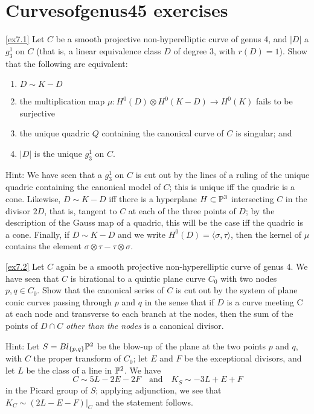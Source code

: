 


\chapter{Curvesofgenus45 exercises}\label{Curvesofgenus45 exercises}


\begin{exercise}\ref{ex7.1}
Let $C$ be a smooth projective non-hyperelliptic curve of genus 4, and $|D|$ a $g^1_3$ on $C$ (that is, a linear equivalence class $D$ of degree 3, with $r(D) = 1$). Show that the following are equivalent:
\begin{enumerate}
\item $D \sim K-D$
\item the multiplication map $\mu : H^0(D) \otimes H^0(K-D) \to H^0(K)$ fails to be surjective
\item the unique quadric $Q$ containing the canonical curve of $C$ is singular; and
\item $|D|$ is the unique $g^1_3$ on $C$.
\end{enumerate}
\end{exercise}

Hint: We have seen that a $g^1_3$ on $C$ is cut out by the lines of a ruling of the unique quadric containing the canonical model of $C$; this is unique iff the quadric is a cone. Likewise,  $D \sim K-D$ iff there is a hyperplane $H \subset \PP^3$ intersecting $C$ in the divisor $2D$, that is, tangent to $C$ at each of the three points of $D$; by the description of the Gauss map of a quadric, this will be the case iff the quadric is a cone. Finally, if $D \sim K-D$ and we write $H^0(D) = \langle \sigma, \tau \rangle$, then the kernel of $\mu$ contains the element $\sigma \otimes \tau - \tau \otimes \sigma$.

\begin{exercise}\ref{ex7.2}
Let $C$ again be a smooth projective non-hyperelliptic curve of genus 4. We have seen that $C$ is birational to a quintic plane curve $C_0$ with two nodes $p, q \in C_0$. Show that the canonical series of $C$ is cut out by the system of plane conic curves passing through $p$ and $q$ in the sense
that if $D$ is a curve meeting C at each node and transverse to each branch at the nodes, then
the sum of the points of $D\cap C$ \emph{other than the nodes} is a canonical divisor.
\end{exercise}

Hint: Let $S = Bl_{\{p,q\}}\PP^2$ be the blow-up of the plane at the two points $p$ and $q$, with $C$ the proper transform of $C_0$; let $E$ and $F$ be the exceptional divisors, and let $L$ be the class of a line in $\PP^2$. We have
$$
C \sim 5L -2E - 2F \quad \text{and} \quad K_S \sim -3L + E + F
$$
in the Picard group of $S$; applying adjunction, we see that $K_C \sim (2L - E - F)|_C$ and the statement follows.

